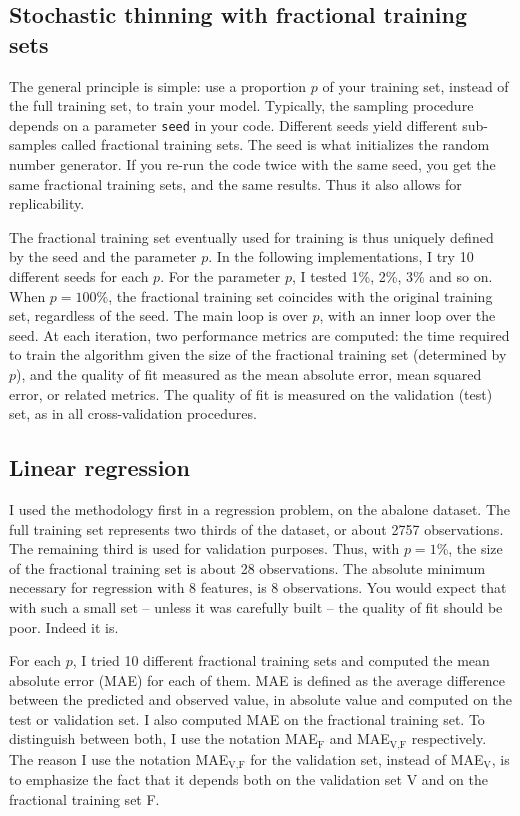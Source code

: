 \documentclass[oneside,10pt]{book}
\begin{document}
\subsection{Stochastic thinning with fractional training sets}

The general principle is simple: use a proportion $p$ of your training set, instead of the full training set, to train your model. Typically,
  the sampling procedure depends on a parameter \texttt{seed} in your code. Different seeds yield different sub-samples called
\textcolor{index}{fractional training sets}. The seed is what initializes the random number generator. If you re-run the code twice with the same seed, you get the same fractional training sets, and the same results. Thus it also allows for replicability.

The fractional training set eventually used for training is thus uniquely defined by the seed and the parameter $p$. In the following implementations, I try 10 different seeds for each $p$. For the parameter $p$, I tested 1\%, 2\%, 3\% and so on. When $p=100\%$, the fractional training set coincides with the original training set, regardless of the seed. The main loop is over $p$, with an inner loop
 over the seed. At each iteration, two performance metrics are computed: the time required to train the algorithm given the size
 of the fractional training set (determined by $p$), and the quality of fit measured as the mean absolute error, mean squared error, or related metrics.  The quality of fit is measured on the validation (test) set, as in all cross-validation procedures.

\subsection{Linear regression}\label{linregd6}

I used the methodology first in a regression problem, on the abalone dataset. The full training set represents two thirds of the dataset, or about 2757 observations. The remaining third is used for validation purposes. Thus, with $p=1\%$, the size of the fractional training set is
 about 28 observations. The absolute minimum necessary for regression with 8 features, is 8 observations. You would expect that with such a small set -- unless it was carefully built --  the quality of fit should be poor. Indeed it is.

For each $p$, I tried 10 different fractional training sets and computed the mean absolute error (MAE) for each of them. MAE is defined
  as the average difference between the predicted and observed value, in absolute value and computed on the test or validation set. I also
 computed MAE on the fractional training set. To distinguish between both, I use the notation
 MAE$_\text{F}$ and MAE$_{\text{V,F}}$ respectively. The reason I use the notation MAE$_{\text{V,F}}$ for the validation set, instead
 of MAE$_{\text{V}}$, is to emphasize the fact that it depends both on the validation set V and on the fractional training set F.
\end{document}
